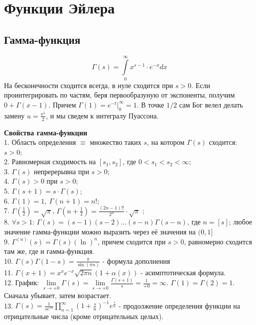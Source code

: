\chapter{Функции Эйлера}
\section{Гамма-функция}
$$\Gamma(s)=\int\limits_{0}^{\infty}x^{s-1}\cdot e^{-x}dx$$
На бесконечности сходится всегда, в нуле сходится при $s>0$.
Если проинтегрировать по частям, беря первообразуную от экспоненты, 
получим  $0+\Gamma(x-1)$. Причем $\Gamma(1)=e^{-t}\Big|_0^\infty=1$.
В точке $1/2$ сам Бог велел делать замену  $u=\frac{x^1}{2}$, и мы 
сведем к интегралу Пуассона. 

\textbf{Свойства гамма-функции}\\
1. Область определения $\equiv$ множество таких $s$, на котором 
$\Gamma(s)$ сходится:  $s>0$;\\
2. Равномерная сходимость на $[s_1,s_2]$, где $0<s_1<s_2<\infty$;\\
3. $\Gamma(s)$ непререрывна при  $s>0$;\\
4.  $\Gamma(s)>0$ при  $s>0$;\\
5.  $\boxed{\Gamma(s+1)=s\cdot \Gamma(s)}$;\\
6. $\Gamma(1)=1,~\Gamma(n+1)=n!$;\\
7.  $\Gamma\left( \frac{1}{2} \right)=\sqrt{\pi}$, $\Gamma\left( 
n+\frac{1}{2}\right)=\frac{(2n-1)!!}{2^n}\cdot \sqrt{\pi}$ ;\\
8. $\forall s>1$: $\Gamma(s)=(s-1)(s-2)...(s-n)\Gamma(s-n)$, где  $n=[s]$; 
любое значение гамма-функции можно выразить через её значения на $(0,1]$\\
9. $\Gamma^{(n)}(s)=\Gamma(s)(\ln)^n$, причем сходится при $s>0$, равномерно
сходится там же, где и гамма-функция.\\
10. $\Gamma(s)\Gamma(1-s)=\frac{\pi}{\sin(\pi n)}$ - формула дополнения\\
11. $\Gamma(x+1)=x^xe^{-x}\sqrt{2\pi n}(1+\alpha(x))$ - асимптотическая 
формула.\\
12. График: $\lim\limits_{s \to +0} \Gamma(s)=
\lim\limits_{s \to +0} \frac{\Gamma(s+1)}{s}=\frac{1}{+0}=\infty$.
$\Gamma(1)=\Gamma(2)=1$. Сначала убывает, затем возрастает.\\
13. $\Gamma(s)=\frac{1}{se^{\gamma s}}\prod\limits_{n=1}^{\infty}
\left( 1+\frac{s}{n} \right)^{-1}e^{\frac{s}{n}}$ - продолжение определения
функции на отрицательные числа (кроме отрицательных целых). 

